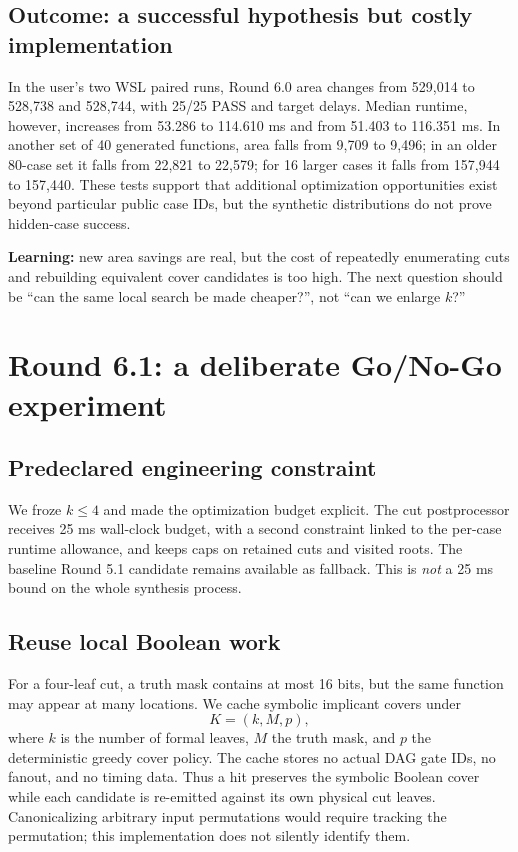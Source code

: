 \subsection{Outcome: a successful hypothesis but costly implementation}
In the user's two WSL paired runs, Round 6.0 area changes from 529,014 to 528,738 and 528,744, with 25/25 PASS and target delays. Median runtime, however, increases from 53.286 to 114.610 ms and from 51.403 to 116.351 ms. In another set of 40 generated functions, area falls from 9,709 to 9,496; in an older 80-case set it falls from 22,821 to 22,579; for 16 larger cases it falls from 157,944 to 157,440. These tests support that additional optimization opportunities exist beyond particular public case IDs, but the synthetic distributions do not prove hidden-case success.

\begin{tcolorbox}[colback=ResearchPeach!30,colframe=ResearchRose,title=Decision after Round 6.0]
\textbf{Learning:} new area savings are real, but the cost of repeatedly enumerating cuts and rebuilding equivalent cover candidates is too high. The next question should be ``can the same local search be made cheaper?'', not ``can we enlarge $k$?''
\end{tcolorbox}

\section{Round 6.1: a deliberate Go/No-Go experiment}
\subsection{Predeclared engineering constraint}
We froze $k\le4$ and made the optimization budget explicit. The cut postprocessor receives 25 ms wall-clock budget, with a second constraint linked to the per-case runtime allowance, and keeps caps on retained cuts and visited roots. The baseline Round 5.1 candidate remains available as fallback. This is \emph{not} a 25 ms bound on the whole synthesis process.

\subsection{Reuse local Boolean work}
For a four-leaf cut, a truth mask contains at most 16 bits, but the same function may appear at many locations. We cache symbolic implicant covers under
\begin{equation}
 K=(k,M,p),
\end{equation}
where $k$ is the number of formal leaves, $M$ the truth mask, and $p$ the deterministic greedy cover policy. The cache stores no actual DAG gate IDs, no fanout, and no timing data. Thus a hit preserves the symbolic Boolean cover while each candidate is re-emitted against its own physical cut leaves. Canonicalizing arbitrary input permutations would require tracking the permutation; this implementation does not silently identify them.

